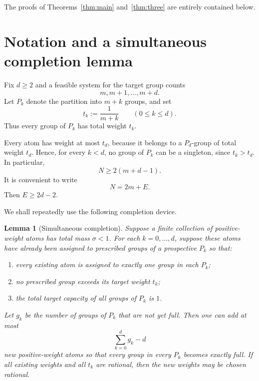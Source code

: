 \documentclass[11pt]{article}
\newtheorem{lemma}[theorem]{Lemma}
\theoremstyle{definition}
\newcommand{\1}{\mathbf{1}}
\begin{document}
The proofs of Theorems~\ref{thm:main} and~\ref{thm:three} are entirely contained below.

\section{Notation and a simultaneous completion lemma}

Fix $d\ge2$ and a feasible system for the target group counts
\[
  m,m+1,\ldots,m+d.
\]
Let $P_k$ denote the partition into $m+k$ groups, and set
\begin{equation}\label{eq:tk}
  t_k:=\frac1{m+k}\qquad(0\le k\le d).
\end{equation}
Thus every group of $P_k$ has total weight $t_k$.

Every atom has weight at most $t_d$, because it belongs to a $P_d$-group of total weight $t_d$.  Hence, for every $k<d$, no group of $P_k$ can be a singleton, since $t_k>t_d$.  In particular,
\begin{equation}\label{eq:elementary-lower}
  N\ge 2(m+d-1).
\end{equation}
It is convenient to write
\begin{equation}\label{eq:E}
  N=2m+E.
\end{equation}
Then $E\ge2d-2$.

We shall repeatedly use the following completion device.

\begin{lemma}[Simultaneous completion]\label{lem:completion}
Suppose a finite collection of positive-weight atoms has total mass $\sigma<1$.  For each $k=0,\ldots,d$, suppose these atoms have already been assigned to prescribed groups of a prospective $P_k$ so that:
\begin{enumerate}[label=\textup{(\roman*)}]
  \item every existing atom is assigned to exactly one group in each $P_k$;
  \item no prescribed group exceeds its target weight $t_k$;
  \item the total target capacity of all groups of $P_k$ is $1$.
\end{enumerate}
Let $g_k$ be the number of groups of $P_k$ that are not yet full.  Then one can add at most
\begin{equation}\label{eq:completion-count}
  \sum_{k=0}^d g_k-d
\end{equation}
new positive-weight atoms so that every group in every $P_k$ becomes exactly full.  If all existing weights and all $t_k$ are rational, then the new weights may be chosen rational.
\end{lemma}
\end{document}
